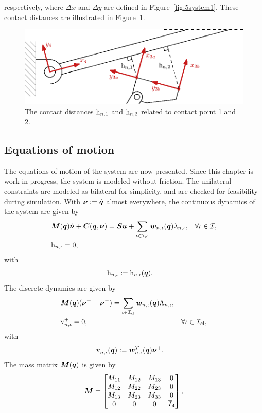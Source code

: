 \documentclass[../DC2019003Bouma.tex]{subfiles}
\begin{document}
respectively, where $\Delta x$ and $\Delta y$ are defined in Figure~\ref{fig:5system1}. These contact distances are illustrated in Figure~\ref{fig:5guards}.
\begin{figure}[bt!]
\centering
\includegraphics[width=.7\textwidth]{guards.eps}\caption{The contact distances $\mathrm{h}_{n,1}$ and $\mathrm{h}_{n,2}$ related to contact point 1 and 2.}\label{fig:5guards}
\end{figure}

\subsection{Equations of motion}
The equations of motion of the system are now presented. Since this chapter is work in progress, the system is modeled without friction. The unilateral constraints are modeled as bilateral for simplicity, and are checked for feasibility during simulation. With $\boldsymbol{\nu} := \dot{{\boldsymbol{q}}}$ almost everywhere, the continuous dynamics of the system are given by
\begin{align}
&{\boldsymbol{M}}({\boldsymbol{q}})\dot{\boldsymbol{\nu}} + {\boldsymbol{C}}({\boldsymbol{q}},\boldsymbol{\nu}) = {\boldsymbol{S}}{\boldsymbol{u}} + \sum_{\iota\in\mathcal{I}_{\text{cl}}}{\boldsymbol{w}}_{n,\iota}({\boldsymbol{q}})\lambda_{n,\iota}, &\forall \iota\in\mathcal{I}, \label{eq:5ncpcontact1}\\
&\mathrm{h}_{n,\iota} = 0,\label{eq:5ncpcontact2}
\end{align}
with 
\begin{align*}
&\mathrm{h}_{n,\iota} := \mathrm{h}_{n,\iota}({\boldsymbol{q}}).
\end{align*}
The discrete dynamics are given by
\begin{align}
&{\boldsymbol{M}}({\boldsymbol{q}})(\boldsymbol{\nu}^+ - \boldsymbol{\nu}^-) = \sum_{\iota\in\mathcal{I}_{\text{cl}}} {\boldsymbol{w}}_{n,\iota}({\boldsymbol{q}})\Lambda_{n,\iota}, \label{eq:5ncpimpact1}\\
&\mathrm{v}_{n,\iota}^+ = 0, &\forall \iota\in\mathcal{I}_{\text{cl}},\label{eq:5ncpimpact2}
\end{align}
with 
\begin{align*}
\mathrm{v}^+_{n,\iota}({\boldsymbol{q}}) &:= {\boldsymbol{w}}^T_{n,\iota}({\boldsymbol{q}}) \boldsymbol{\nu}^+.
\end{align*}
The mass matrix ${\boldsymbol{M}}({\boldsymbol{q}})$ is given by
\begin{align}
{\boldsymbol{M}} = \begin{bmatrix}
M_{11} & M_{12} & M_{13} & 0\\
M_{12} & M_{22} & M_{23} & 0\\
M_{13} & M_{23} & M_{33} & 0\\
0 & 0 & 0 & \overline{I}_4
\end{bmatrix},
\end{align}
\end{document}
